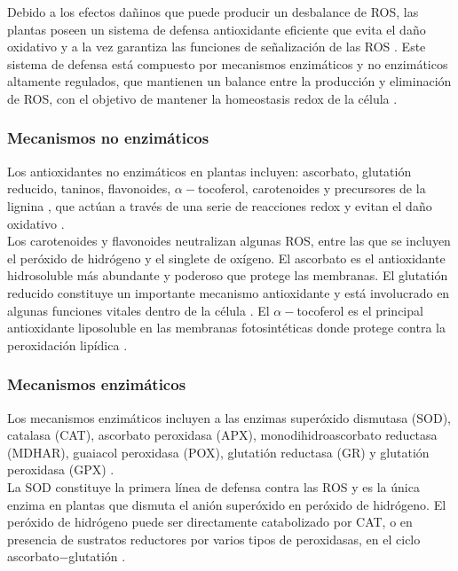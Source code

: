Debido a los efectos da\~ninos que puede producir un desbalance de ROS, las plantas poseen un sistema de defensa antioxidante eficiente que evita el da\~no oxidativo y a la vez garantiza las funciones de se\~nalizaci\'on de las ROS \citep{liu2009oxidative, gill2010reactive}. Este sistema de defensa est\'a compuesto por mecanismos enzimáticos y no enzimáticos altamente regulados, que mantienen un balance entre la producción y eliminación de ROS, con el objetivo de mantener la homeostasis redox de la célula \citep{moller2001plant}.

\subsubsection{Mecanismos no enzim\'aticos}

Los antioxidantes no enzimáticos en plantas incluyen: ascorbato, glutati\'on reducido, taninos, flavonoides, $\alpha -$tocoferol, carotenoides y precursores de la lignina \citep{apel2004reactive}, que act\'uan a trav\'es de una serie de reacciones redox y evitan el da\~no oxidativo \citep{blokhina2003antioxidants}.\\

Los carotenoides y flavonoides neutralizan algunas ROS, entre las que se incluyen el per\'oxido de hidr\'ogeno y el singlete de ox\'igeno. El ascorbato es el antioxidante hidrosoluble m\'as abundante y poderoso que protege las membranas. El glutatión reducido constituye un importante mecanismo antioxidante y est\'a involucrado en algunas funciones vitales dentro de la c\'elula \citep{mittler2002oxidative}. El $\alpha-$tocoferol es el principal antioxidante liposoluble en las membranas fotosint\'eticas donde protege contra la peroxidaci\'on lip\'idica \citep{gechev2006reactive}. 

\subsubsection{Mecanismos enzim\'aticos}

Los mecanismos enzimáticos incluyen a las enzimas superóxido dismutasa (SOD), catalasa (CAT), ascorbato peroxidasa (APX), monodihidroascorbato reductasa (MDHAR), guaiacol peroxidasa (POX), glutatión reductasa (GR) y glutati\'on peroxidasa (GPX) \citep{ruley2004antioxidant}. \\

La SOD constituye la primera línea de defensa contra las ROS y es la \'unica enzima en plantas que dismuta el ani\'on super\'oxido en per\'oxido de hidr\'ogeno. El per\'oxido de hidr\'ogeno puede ser directamente catabolizado por CAT, o en presencia de sustratos reductores por varios tipos de peroxidasas, en el ciclo ascorbato$-$glutati\'on \citep{halliwell2006reactive}.\\


